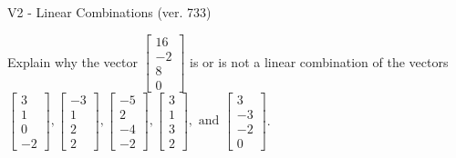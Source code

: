 \begin{exercise}
  \begin{exerciseTitle}V2 - Linear Combinations (ver. 733)\end{exerciseTitle}
  \begin{exerciseStatement}
    Explain why the vector \(\left[\begin{array}{c}
16 \\
-2 \\
8 \\
0
\end{array}\right]\)  is or is not a linear 
	combination of the vectors \(\left[\begin{array}{c}
3 \\
1 \\
0 \\
-2
\end{array}\right] , \left[\begin{array}{c}
-3 \\
1 \\
2 \\
2
\end{array}\right] , \left[\begin{array}{c}
-5 \\
2 \\
-4 \\
-2
\end{array}\right] , \left[\begin{array}{c}
3 \\
1 \\
3 \\
2
\end{array}\right] , \text{ and } \left[\begin{array}{c}
3 \\
-3 \\
-2 \\
0
\end{array}\right]\).
	



\end{exerciseStatement}
\end{exercise}
